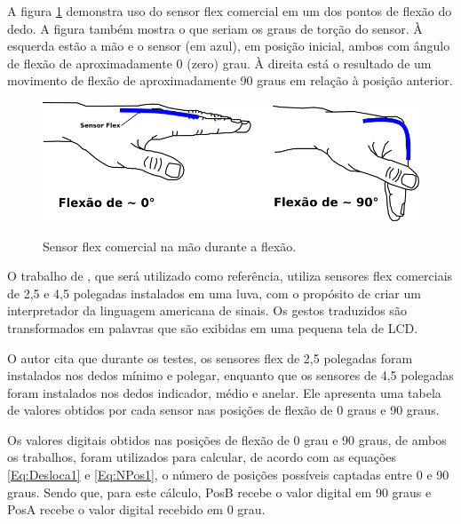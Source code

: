 \documentclass[
	12pt,				%
	openright,			%
	oneside,			%
	a4paper,			%
	english,			%
	brazil				%
	]{abntex2}
\begin{document}
		A figura \ref{Fig:hand-flexsensor-degrees1} demonstra uso do sensor flex comercial em um dos pontos de flexão do dedo. A figura também mostra o que seriam os graus de torção do sensor. À esquerda estão a mão e o sensor (em azul), em posição inicial, ambos com ângulo de flexão de aproximadamente 0 (zero) grau. À direita está o resultado de um movimento de flexão de aproximadamente 90 graus em relação à posição anterior.


	\begin{figure}[!h]
		\centering
		\caption{Sensor flex comercial na mão durante a flexão.}
		\includegraphics[width=13cm,keepaspectratio=true]{./figures/hand-flexsensor-degrees1.png}
		\label{Fig:hand-flexsensor-degrees1}
	\end{figure}

	
		O trabalho de \cite{anbarasi2013deafmute}, que será utilizado como referência, utiliza sensores flex comerciais de 2,5 e 4,5 polegadas instalados em uma luva, com o propósito de criar um interpretador da linguagem americana de sinais. Os gestos traduzidos são transformados em palavras que são exibidas em uma pequena tela de LCD.

		O autor cita que durante os testes, os sensores flex de 2,5 polegadas foram instalados nos dedos mínimo e polegar, enquanto que os sensores de 4,5 polegadas foram instalados nos dedos indicador, médio e anelar. Ele apresenta uma tabela de valores obtidos por cada sensor nas posições de flexão de 0 graus e 90 graus.

		
		Os valores digitais obtidos nas posições de flexão de 0 grau e 90 graus, de ambos os trabalhos, foram utilizados para calcular, de acordo com as equações \ref{Eq:Desloca1} e \ref{Eq:NPos1}, o número de posições possíveis captadas entre 0 e 90 graus. Sendo que, para este cálculo, PosB recebe o valor digital em 90 graus e PosA recebe o valor digital recebido em 0 grau.
\end{document}
